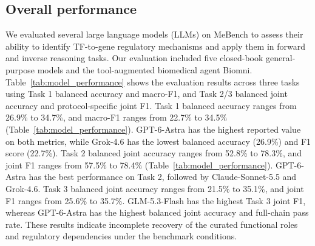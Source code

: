\subsection{Overall performance}

We evaluated several large language models (LLMs) on MeBench to assess their ability to identify TF-to-gene regulatory mechanisms and apply them in forward and inverse reasoning tasks. Our evaluation included five closed-book general-purpose models and the tool-augmented biomedical agent Biomni. Table~\ref{tab:model_performance} shows the evaluation results across three tasks using Task 1 balanced accuracy and macro-F1, and Task 2/3 balanced joint accuracy and protocol-specific joint F1. Task 1 balanced accuracy ranges from 26.9\% to 34.7\%, and macro-F1 ranges from 22.7\% to 34.5\% (Table~\ref{tab:model_performance}). GPT-6-Astra has the highest reported value on both metrics, while Grok-4.6 has the lowest balanced accuracy (26.9\%) and F1 score (22.7\%). Task 2 balanced joint accuracy ranges from 52.8\% to 78.3\%, and joint F1 ranges from 57.5\% to 78.4\% (Table~\ref{tab:model_performance}). GPT-6-Astra has the best performance on Task 2, followed by Claude-Sonnet-5.5 and Grok-4.6. Task 3 balanced joint accuracy ranges from 21.5\% to 35.1\%, and joint F1 ranges from 25.6\% to 35.7\%. GLM-5.3-Flash has the highest Task 3 joint F1, whereas GPT-6-Astra has the highest balanced joint accuracy and full-chain pass rate. These results indicate incomplete recovery of the curated functional roles and regulatory dependencies under the benchmark conditions. 



